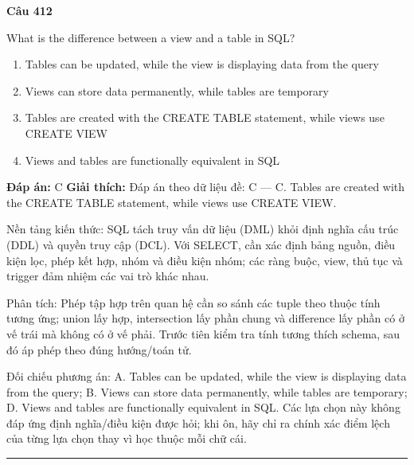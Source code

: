 \documentclass[11pt,a4paper]{article}
\newenvironment{question}[1]{%
  \par\vspace{1em}\noindent\textbf{\large Câu #1}\par\vspace{0.4em}
}{%
  \par\vspace{1em}\hrule\vspace{0.6em}
}
\newenvironment{choices}{%
  \begin{enumerate}[label=\textbf{\Alph*.},leftmargin=2.2em,itemsep=2pt,topsep=3pt]
}{%
  \end{enumerate}
}
\newcommand{\choice}{\item}
\begin{document}
\begin{question}{412}
What is the difference between a view and a table in SQL?
\begin{choices}
\choice Tables can be updated, while the view is displaying data from the query
\choice Views can store data permanently, while tables are temporary
\choice Tables are created with the CREATE TABLE statement, while views use CREATE VIEW
\choice Views and tables are functionally equivalent in SQL
\end{choices}
\textbf{Đáp án:} C
\textbf{Giải thích:} Đáp án theo dữ liệu đề: C — C. Tables are created with the CREATE TABLE statement, while views use CREATE VIEW.

Nền tảng kiến thức: SQL tách truy vấn dữ liệu (DML) khỏi định nghĩa cấu trúc (DDL) và quyền truy cập (DCL). Với SELECT, cần xác định bảng nguồn, điều kiện lọc, phép kết hợp, nhóm và điều kiện nhóm; các ràng buộc, view, thủ tục và trigger đảm nhiệm các vai trò khác nhau.

Phân tích: Phép tập hợp trên quan hệ cần so sánh các tuple theo thuộc tính tương ứng; union lấy hợp, intersection lấy phần chung và difference lấy phần có ở vế trái mà không có ở vế phải. Trước tiên kiểm tra tính tương thích schema, sau đó áp phép theo đúng hướng/toán tử.

Đối chiếu phương án: A. Tables can be updated, while the view is displaying data from the query; B. Views can store data permanently, while tables are temporary; D. Views and tables are functionally equivalent in SQL. Các lựa chọn này không đáp ứng định nghĩa/điều kiện được hỏi; khi ôn, hãy chỉ ra chính xác điểm lệch của từng lựa chọn thay vì học thuộc mỗi chữ cái.
\end{question}
\end{document}
